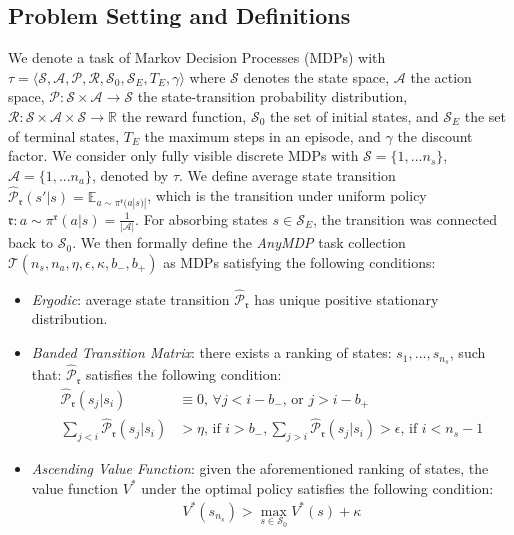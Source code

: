 \documentclass{article}
\begin{document}
\subsection{Problem Setting and Definitions}
We denote a task of Markov Decision Processes (MDPs) with $\tau =\langle \mathcal{S}, \mathcal{A}, \mathcal{P}, \mathcal{R}, \mathcal{S}_0, \mathcal{S}_E,T_E,\gamma \rangle$ where $\mathcal{S}$ denotes the state space, $\mathcal{A}$ the action space, $\mathcal{P}:\mathcal{S}\times\mathcal{A}\rightarrow\mathcal{S}$ the state-transition probability distribution, $\mathcal{R}:\mathcal{S}\times\mathcal{A}\times\mathcal{S}\rightarrow\mathbb{R}$ the reward function, $\mathcal{S}_0$ the set of initial states, and $\mathcal{S}_E$ the set of terminal states, $T_E$ the maximum steps in an episode, and $\gamma$ the discount factor. We consider only fully visible discrete MDPs with $\mathcal{S}=\{1,...n_s\}$, $\mathcal{A}=\{1,...n_a\}$, denoted by $\tau$. We define average state transition $\hat{\mathcal{P}}_{\mathfrak{r}}(s'|s) = \mathbb{E}_{a \sim \pi^{\mathfrak{r}}(a|s)|}$, which is the transition under uniform policy $\mathfrak{r}: a \sim \pi^{\mathfrak{r}}(a|s) = \frac{1}{|\mathcal{A}|}$.
For absorbing states $s \in \mathcal{S}_E$, the transition was connected back to $\mathcal{S}_0$.
We then formally define the \emph{AnyMDP} task collection $\mathcal{T}(n_s,n_a,\eta,\epsilon,\kappa, b_{-},b_{+})$ as MDPs satisfying the following conditions:
\begin{itemize}
\item \emph{Ergodic}: average state transition $\hat{\mathcal{P}}_{\mathfrak{r}}$ has unique positive stationary distribution.
\item \emph{Banded Transition Matrix}:  there exists a ranking of states: $s_1,...,s_{n_s}$, such that: $\hat{\mathcal{P}}_{\mathfrak{r}}$ satisfies the following condition:
\begin{align}
    \hat{\mathcal{P}}_\mathfrak{r}(s_j|s_i) &\equiv 0 \text{, } \forall j<i-b_{-} \text{, or } j>i-b_{+} \nonumber\\
    \sum_{j<i} \hat{\mathcal{P}}_\mathfrak{r}(s_j|s_i) &> \eta \text{, if } i>b_{-}, \sum_{j>i} \hat{\mathcal{P}}_\mathfrak{r}(s_j|s_i) > \epsilon \text{, if } i<n_s-1 \label{eq:banded_transition}
\end{align}
\item \emph{Ascending Value Function}: given the aforementioned ranking of states, the value function $V^*$ under the optimal policy satisfies the following condition:
\begin{align}
    V^*(s_{n_s}) > \max_{s\in\mathcal{S}_0}V^*(s) + \kappa \label{eq:ascending}
\end{align}
\end{itemize}
\end{document}
